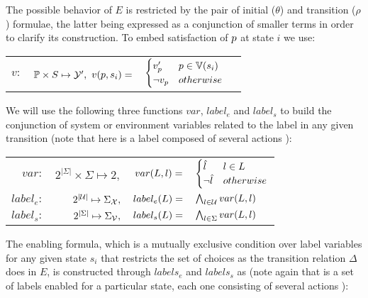 The possible behavior of $E$ is restricted by the pair of initial ($\theta$) and transition ($\rho$) formulae, the latter being expressed as a conjunction of smaller terms in order to clarify its construction.
To embed satisfaction of $\proposition$ at state $i$ we use:
\begin{center}
	\begin{tabular}{r r r l}
$v:$ & $\propositions \times S \mapsto \gsY',$
$
v(\proposition,s_i) = $ & $\begin{cases}
v_{\proposition}' & \proposition \in \valuations(s_i) \\
\neg v_{\proposition} & otherwise
\end{cases}
$
\end{tabular}
\end{center}
We will use the following three functions $var$, $label_e$ and $label_s$ to build the conjunction of system or environment variables related to the label in any given transition (note that here \actionLabel is a label composed of several actions \action):
\begin{center}
	\begin{tabular}{r r r l}
$var:$ & $2^{|\Sigma|}\times \Sigma \mapsto 2,$ &
$
var(\actionLabel, \action) = $&
$\begin{cases}
\varLabel{} & \action \in \actionLabel \\
\neg \varLabel{} & otherwise
\end{cases}

$\\
$label_e:$&$2^{|\nonControlSet|}\mapsto \Sigma_{\gsX},$ &
$label_e(\actionLabel) = $&$\bigwedge_{\action \in \nonControlSet}var(\actionLabel, \action)$\\
$label_s:$&$2^{|\Sigma|}\mapsto \Sigma_{\gsV},$ &
$label_s(\actionLabel) = $&$\bigwedge_{\action \in \Sigma}var(\actionLabel, \action)$\\
\end{tabular}
\end{center}

The enabling formula, which is a mutually exclusive condition over label variables for any given state $s_i$ that restricts the set of choices as the transition relation $\Delta$ does in $E$, is constructed through $labels_e$ and $labels_s$ as (note again that  is a set of labels \actionLabel enabled for a particular state, each one consisting of several actions \action):

